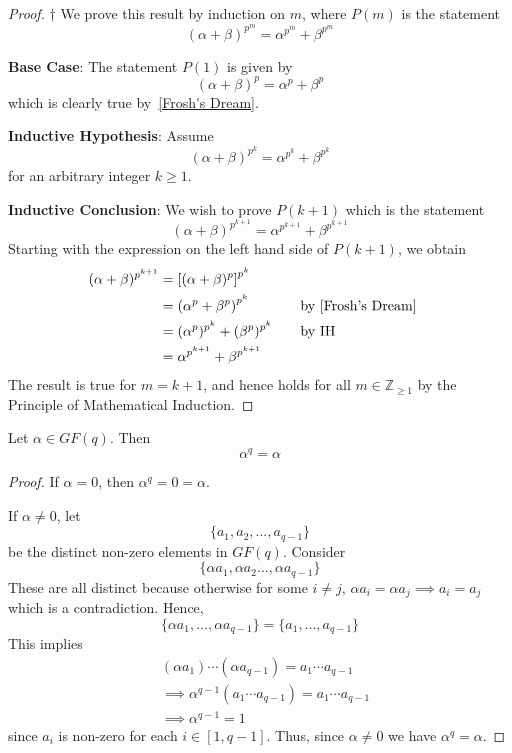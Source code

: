\begin{proof} $ \dagger $
    We prove this result by induction on $ m $, where $ P(m) $ is the statement
    \[ (\alpha+\beta)^{p^m}=\alpha^{p^m}+\beta^{p^m} \]

    \textbf{Base Case}: The statement $ P(1) $ is given by
    \[ (\alpha+\beta)^{p}=\alpha^p+\beta^p \]
    which is clearly true by~\ref{Frosh's Dream}.

    \textbf{Inductive Hypothesis}: Assume
    \[ (\alpha+\beta)^{p^k}=\alpha^{p^k}+\beta^{p^k} \]
    for an arbitrary integer $ k\geqslant 1 $.

    \textbf{Inductive Conclusion}: We wish to prove $ P(k+1) $
    which is the statement
    \[ (\alpha+\beta)^{p^{k+1}}=\alpha^{p^{k+1}}+\beta^{p^{k+1}} \]
    Starting with the expression on the left hand side of $ P(k+1) $,
    we obtain
    \[ \begin{aligned}
            (\alpha+\beta)^{p^{k+1}}
             & =\left[ (\alpha+\beta)^{p} \right]^{p^{k}}                                         \\
             & =\left( \alpha^p+\beta^p \right)^{p^k}     & \quad & \text{by~\ref{Frosh's Dream}} \\
             & = (\alpha^p)^{p^k}+(\beta^p)^{p^k}         &       & \text{by IH}                  \\
             & =\alpha^{p^{k+1}}+\beta^{p^{k+1}}
        \end{aligned}
    \]
    The result is true for $ m=k+1 $, and hence holds for all $ m\in\mathbb{Z}_{\geqslant 1} $
    by the Principle of Mathematical Induction.
\end{proof}

\begin{thmbox}
    \begin{theorem}
        Let $ \alpha\in GF(q) $. Then
        \[ \alpha^q=\alpha \]
    \end{theorem}
\end{thmbox}

\begin{proof}
    If $ \alpha=0 $, then $ \alpha^q=0=\alpha $.

    If $ \alpha\neq 0 $, let
    \[ \{a_1,a_2,\ldots ,a_{q-1}\} \]
    be the distinct non-zero elements in $ GF(q) $. Consider
    \[ \{\alpha a_1,\alpha a_2\ldots,\alpha a_{q-1}\} \]
    These are all distinct because otherwise for some $ i\neq j $,
    $ \alpha a_i=\alpha a_j\implies a_i=a_j $ which is a contradiction.
    Hence,
    \[ \{\alpha a_1,\ldots ,\alpha a_{q-1}\}=\{a_1,\ldots ,a_{q-1}\} \]
    This implies
    \begin{align*}
         & (\alpha a_1)\cdots (\alpha a_{q-1})=a_1\cdots a_{q-1}      \\
         & \implies \alpha^{q-1}(a_1\cdots a_{q-1})=a_1\cdots a_{q-1} \\
         & \implies \alpha^{q-1}=1
    \end{align*}
    since $ a_i $ is non-zero for each $ i\in[1,q-1] $.
    Thus, since $ \alpha\neq 0 $ we have $ \alpha^q=\alpha $.
\end{proof}

